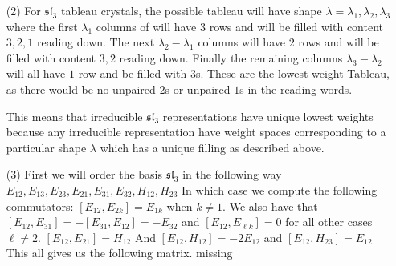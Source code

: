 \documentclass[12pt]{amsart}
\begin{document}
\begin{itemize}
    \item[(2)] %
    For $\mathfrak{sl}_3$ tableau crystals, the possible tableau will have shape 
    $\lambda={\lambda_1,\lambda_2,\lambda_3}$ where the first $\lambda_1$ columns of will 
    have $3$ rows and will be filled with content $3,2,1$ reading down. The next  $\lambda_2-\lambda_1$ columns
    will have $2$ rows and will be filled with content $3,2$ reading down. 
    Finally the remaining columns $\lambda_3-\lambda_2$ will all have $1$ row and be filled with $3$s.
    These are the lowest weight Tableau, as there would be no unpaired $2$s or unpaired $1$s in the reading words.

    This means that irreducible $\mathfrak{sl}_3$ representations have unique lowest weights 
    because any irreducible representation have weight spaces corresponding to a particular shape $\lambda$ 
    which has a unique filling as described above.\\

    \item[(3)] %
    First we will order the basis $\mathfrak{sl}_3$ in the following way 
    $E_{12},E_{13},E_{23},E_{21},E_{31},E_{32},H_{12},H_{23}$
    In which case we compute the following commutators:
    $[E_{12},E_{2k}]=E_{1k}$ when $k\neq 1$. We also have that $[E_{12}, E_{31}]=-[E_{31}, E_{12}]=-E_{32}$
    and 
    $[E_{12},E_{\ell k}]=0$ for all other cases $\ell\neq 2$.
    $[E_{12},E_{21}]=H_{12}$
    And $[E_{12},H_{12}]=-2E_{12}$ and $[E_{12},H_{23}]=E_{12}$
    This all gives us the following matrix. 
    missing 


\end{itemize}
\end{document}
